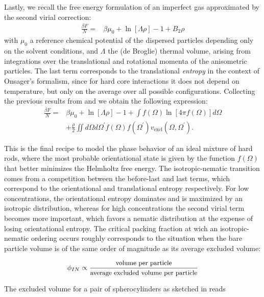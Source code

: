 Lastly, we recall the free energy formulation of an imperfect gas approximated by the second virial correction:
\begin{align}
\frac{\beta F}{N} =& \beta \mu_{0}+\ln\left[\Lambda\rho\right]-1+ B_2 \rho
\end{align}
with $\mu_{0}$ a reference chemical potential of the dispersed particles depending only on the solvent conditions, and $\Lambda$ the (de Broglie) thermal volume, arising from
integrations over the translational and rotational momenta of the anisometric particles. The last term corresponds to the translational {\em entropy} in the context of Onsager's formalism, since for hard core interactions it does not depend on temperature, but only on the average over all possible configurations. Collecting the previous results from  and  we obtain the following expression:
\begin{align}
\frac{\beta F}{N} =& \beta \mu_{0}+\ln\left[\Lambda\rho\right]-1+
\int f(\Omega)\ln \left[4\pi f(\Omega)\right]d\Omega \nonumber \\
&+\frac{\rho}{2} \iint d\Omega d\Omega^{\prime}
f(\Omega)f(\Omega^{\prime})v_{\text{excl}}(\Omega,\Omega^{\prime}). \label{0freetot}
\end{align}

This is the final recipe to model the phase behavior of an ideal mixture of hard rods, where the most probable orientational state is given by the function $f(\Omega)$ that better minimizes the Helmholtz free energy. The isotropic-nematic transition comes from a competition between the before-last and last terms, which correspond to the orientational and translational entropy respectively. For low concentrations, the orientational entropy dominates and is maximized by an isotropic distribution, whereas for high concentrations the second virial term becomes more important, which favors a nematic distribution at the expense of losing orientational entropy. The critical packing fraction at wich an isotropic-nematic ordering occurs roughly corresponds to the situation when the bare particle volume is of the same order of magnitude as its average excluded volume:

\begin{equation}
\phi_{IN} \propto \frac{\mbox{{\small volume per particle}}}{\mbox{{\small average excluded volume per particle}}}
\end{equation}

The excluded volume for a pair of spherocylinders as sketched in  reads

